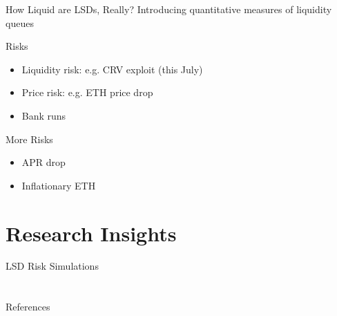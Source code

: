 \documentclass{beamer}
\begin{document}
\begin{frame}{How Liquid are LSDs, Really?}
    Introducing quantitative measures of liquidity\\
    queues
\end{frame}


\begin{frame}{Risks}
    \begin{itemize}
        \item Liquidity risk: e.g. CRV exploit (this July)
        \item Price risk: e.g. ETH price drop
        \item Bank runs
    \end{itemize}
\end{frame}


\begin{frame}{More Risks}
    \begin{itemize}
        \item APR drop
        \item Inflationary ETH
    \end{itemize}
\end{frame}

\section{Research Insights}

\begin{frame}{LSD Risk Simulations}
    
\end{frame}

\section*{}

\begin{frame}[allowframebreaks]{References}
    \nocite{*}
    \printbibliography
\end{frame}
\end{document}
